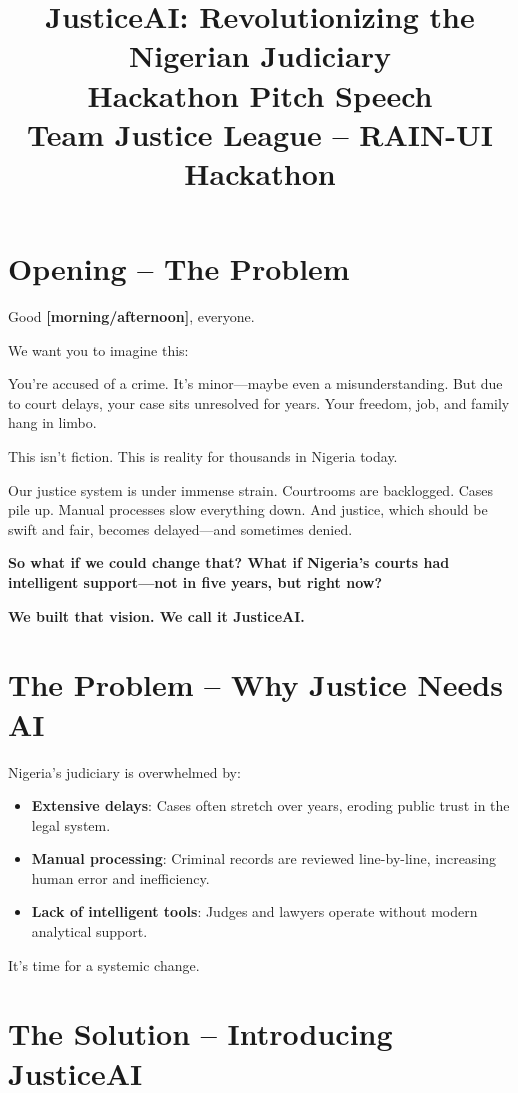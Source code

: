 \documentclass[12pt]{article}
\title{\textbf{JusticeAI: Revolutionizing the Nigerian Judiciary} \\ \vspace{0.3em} \large Hackathon Pitch Speech \\ \vspace{0.3em} \normalsize Team Justice League – RAIN-UI Hackathon}
\date{}
\begin{document}
\maketitle
{}

\section*{Opening – The Problem}

Good \textbf{[morning/afternoon]}, everyone.

We want you to imagine this:

You're accused of a crime. It's minor—maybe even a misunderstanding. But due to court delays, your case sits unresolved for years. Your freedom, job, and family hang in limbo.

This isn’t fiction. This is reality for thousands in Nigeria today.

Our justice system is under immense strain. Courtrooms are backlogged. Cases pile up. Manual processes slow everything down. And justice, which should be swift and fair, becomes delayed—and sometimes denied.

\textbf{So what if we could change that? What if Nigeria’s courts had intelligent support—not in five years, but right now?}

\textbf{We built that vision. We call it JusticeAI.}

\section*{The Problem – Why Justice Needs AI}

Nigeria's judiciary is overwhelmed by:

\begin{itemize}
    \item \textbf{Extensive delays}: Cases often stretch over years, eroding public trust in the legal system.
    \item \textbf{Manual processing}: Criminal records are reviewed line-by-line, increasing human error and inefficiency.
    \item \textbf{Lack of intelligent tools}: Judges and lawyers operate without modern analytical support.
\end{itemize}

It’s time for a systemic change.

\section*{The Solution – Introducing JusticeAI}
\end{document}
